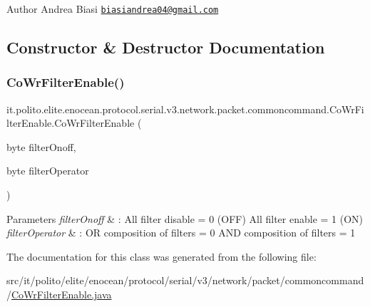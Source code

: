 \begin{DoxyAuthor}{Author}
Andrea Biasi \href{mailto:biasiandrea04@gmail.com}{\tt biasiandrea04@gmail.\+com} 
\end{DoxyAuthor}


\subsection{Constructor \& Destructor Documentation}
\hypertarget{classit_1_1polito_1_1elite_1_1enocean_1_1protocol_1_1serial_1_1v3_1_1network_1_1packet_1_1commoncommand_1_1_co_wr_filter_enable_a7abb1045a8f8180c1d015b6a0e26048f}{}\label{classit_1_1polito_1_1elite_1_1enocean_1_1protocol_1_1serial_1_1v3_1_1network_1_1packet_1_1commoncommand_1_1_co_wr_filter_enable_a7abb1045a8f8180c1d015b6a0e26048f} 
\subsubsection{\texorpdfstring{Co\+Wr\+Filter\+Enable()}{CoWrFilterEnable()}}
{\footnotesize\ttfamily it.\+polito.\+elite.\+enocean.\+protocol.\+serial.\+v3.\+network.\+packet.\+commoncommand.\+Co\+Wr\+Filter\+Enable.\+Co\+Wr\+Filter\+Enable (\begin{DoxyParamCaption}\item[{byte}]{filter\+Onoff,  }\item[{byte}]{filter\+Operator }\end{DoxyParamCaption})}


\begin{DoxyParams}{Parameters}
{\em filter\+Onoff} & \+: All filter disable = 0 (O\+FF) All filter enable = 1 (ON) \\
\hline
{\em filter\+Operator} & \+: OR composition of filters = 0 A\+ND composition of filters = 1 \\
\hline
\end{DoxyParams}


The documentation for this class was generated from the following file\+:\begin{DoxyCompactItemize}
\item 
src/it/polito/elite/enocean/protocol/serial/v3/network/packet/commoncommand/\hyperlink{_co_wr_filter_enable_8java}{Co\+Wr\+Filter\+Enable.\+java}\end{DoxyCompactItemize}

